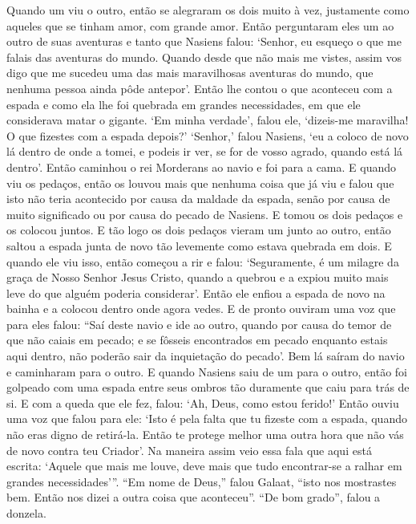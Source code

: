 Quando um viu o outro, então se alegraram os dois muito à vez, justamente como
aqueles que se tinham amor, com grande amor. Então perguntaram eles um ao outro
de suas aventuras e tanto que Nasiens falou: ‘Senhor, eu esqueço o que me
falais das aventuras do mundo. Quando desde que não mais me vistes, assim vos
digo que me sucedeu uma das mais maravilhosas aventuras do mundo, que nenhuma
pessoa ainda pôde antepor’. Então lhe contou o que aconteceu com a espada e como
ela lhe foi quebrada em grandes necessidades, em que ele considerava matar o
gigante. ‘Em minha verdade’, falou ele, ‘dizeis-me maravilha! O que fizestes
com a espada depois?’ ‘Senhor,’ falou Nasiens, ‘eu a coloco de novo lá dentro
de onde a tomei, e podeis ir ver, se for de vosso agrado, quando está lá
dentro’. Então caminhou o rei Morderans ao navio e foi para a cama. E quando
viu os pedaços, então os louvou mais que nenhuma coisa que já viu e falou que
isto não teria acontecido por causa da maldade da espada, senão por causa de
muito significado ou por causa do pecado de Nasiens. E tomou os dois pedaços e
os colocou juntos. E tão logo os dois pedaços vieram um junto ao outro, então
saltou a espada junta de novo tão levemente como estava quebrada em dois. E
quando ele viu isso, então começou a rir e falou: ‘Seguramente, é um milagre da
graça de Nosso Senhor Jesus Cristo, quando a quebrou e a expiou muito mais leve
do que alguém poderia considerar’. Então ele enfiou a espada de novo na bainha
e a colocou dentro onde agora vedes. E de pronto ouviram uma voz que para eles
falou: “Saí deste navio e ide ao outro, quando por causa do temor de que não
caiais em pecado; e se fôsseis encontrados em pecado enquanto estais aqui
dentro, não poderão sair da inquietação do pecado’. Bem lá saíram do navio e
caminharam para o outro. E quando Nasiens saiu de um para o outro, então foi
golpeado com uma espada entre seus ombros tão duramente que caiu para trás de
si. E com a queda que ele fez, falou: ‘Ah, Deus, como estou ferido!’ Então
ouviu uma voz que falou para ele: ‘Isto é pela falta que tu fizeste com a
espada, quando não eras digno de retirá-la. Então te protege melhor uma outra
hora que não vás de novo contra teu Criador’. Na maneira assim veio essa fala
que aqui está escrita: ‘Aquele que mais me louve, deve mais que tudo encontrar-se
a ralhar em grandes necessidades’”. “Em nome de Deus,” falou
Galaat, “isto nos mostrastes bem. Então nos dizei a outra coisa que aconteceu”. “De
bom grado”, falou a donzela.


